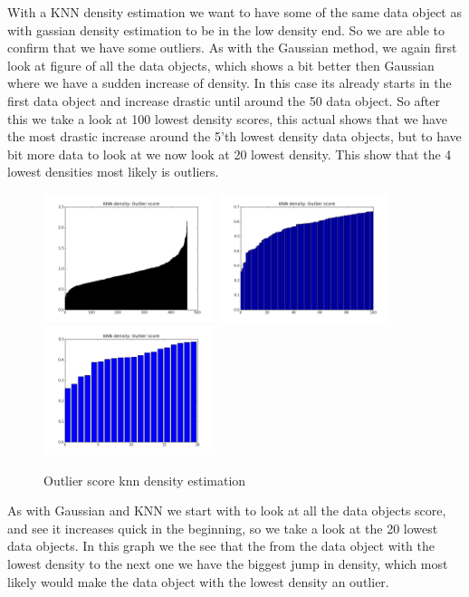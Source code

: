 With a KNN density estimation we want to have some of the same data object as with gassian density estimation to be in the low density end. So we are able to confirm that we have some outliers. As with the Gaussian method, we again first look at figure of all the data objects, which shows a bit better then Gaussian where we have a sudden increase of density. In this case its already starts in the first data object and increase drastic until around the 50 data object. So after this we take a look at 100 lowest density scores, this actual shows that we have the most drastic increase around the 5'th lowest density data objects, but to have bit more data to look at we now look at 20 lowest density. This show that the 4 lowest densities most likely is outliers.

\begin{figure}[H]
\centering
\includegraphics[width=5cm, keepaspectratio=true]{pictures/knndensityEstimationAll.png}
\includegraphics[width=5cm, keepaspectratio=true]{pictures/knndensityEstimation100.png}
\includegraphics[width=5cm, keepaspectratio=true]{pictures/knndensityEstimation20.png}
\vspace{-0.4cm}
\caption{\footnotesize Outlier score knn density estimation}
\label{knn}
\end{figure}

As with Gaussian and KNN we start with to look at all the data objects score, and see it increases quick in the beginning, so we take a look at the 20 lowest data objects. In this graph we the see that the from the data object with the lowest density to the next one we have the biggest jump in density, which most likely would make the data object with the lowest density an outlier.


